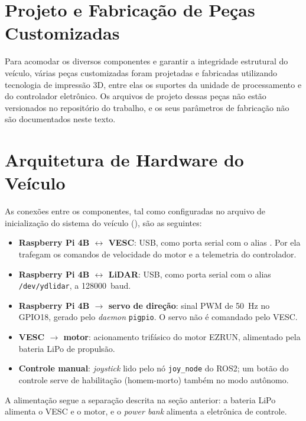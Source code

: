 \section{Projeto e Fabricação de Peças Customizadas}

Para acomodar os diversos componentes e garantir a integridade estrutural do
veículo, várias peças customizadas foram projetadas e fabricadas utilizando
tecnologia de impressão 3D, entre elas os suportes da unidade de processamento
e do controlador eletrônico. Os arquivos de projeto dessas peças não estão
versionados no repositório do trabalho, e os seus parâmetros de fabricação não
são documentados neste texto.

\section{Arquitetura de Hardware do Veículo}

As conexões entre os componentes, tal como configuradas no arquivo de
inicialização do sistema do veículo
(), são as seguintes:

\begin{itemize}
      \item \textbf{Raspberry Pi 4B $\leftrightarrow$ VESC}: USB, como porta
            serial com o alias . Por ela trafegam os
            comandos de velocidade do motor e a telemetria do controlador.
      \item \textbf{Raspberry Pi 4B $\leftrightarrow$ LiDAR}: USB, como porta
            serial com o alias \texttt{/dev/ydlidar}, a 128000~baud.
      \item \textbf{Raspberry Pi 4B $\rightarrow$ servo de direção}: sinal PWM
            de 50~Hz no GPIO18, gerado pelo \textit{daemon} \texttt{pigpio}. O
            servo não é comandado pelo VESC.
      \item \textbf{VESC $\rightarrow$ motor}: acionamento trifásico do motor
            EZRUN, alimentado pela bateria LiPo de propulsão.
      \item \textbf{Controle manual}: \textit{joystick} lido pelo nó
            \texttt{joy\_node} do ROS2; um botão do controle serve de
            habilitação (homem-morto) também no modo autônomo.
\end{itemize}

A alimentação segue a separação descrita na seção anterior: a bateria LiPo
alimenta o VESC e o motor, e o \textit{power bank} alimenta a eletrônica de
controle.

